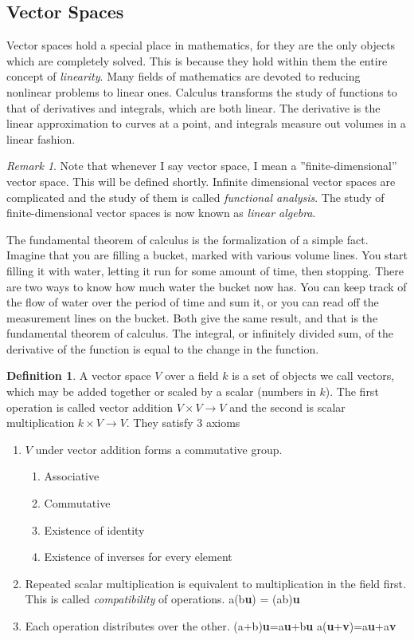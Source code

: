 \documentclass[12pt]{article}
\theoremstyle{definition}
\newtheorem{definition}{Definition}[section]
\theoremstyle{remark}
\newtheorem*{remark}{Remark}
\theoremstyle{example}
\def\b#1{\textbf{#1}}
\begin{document}
\subsection{Vector Spaces}

Vector spaces hold a special place in mathematics, for they are the only objects which are completely solved. This is because they hold within them the entire concept of \textit{linearity}. Many fields of mathematics are devoted to reducing nonlinear problems to linear ones. Calculus transforms the study of functions to that of derivatives and integrals, which are both linear. The derivative is the linear approximation to curves at a point, and integrals measure out volumes in a linear fashion.

\begin{remark}
	Note that whenever I say vector space, I mean a ''finite-dimensional'' vector space. This will be defined shortly. Infinite dimensional vector spaces are complicated and the study of them is called \textit{functional analysis}. The study of finite-dimensional vector spaces is now known as \textit{linear algebra}.
\end{remark}

The fundamental theorem of calculus is the formalization of a simple fact. Imagine that you are filling a bucket, marked with various volume lines. You start filling it with water, letting it run for some amount of time, then stopping. There are two ways to know how much water the bucket now has. You can keep track of the flow of water over the period of time and sum it, or you can read off the measurement lines on the bucket. Both give the same result, and that is the fundamental theorem of calculus. The integral, or infinitely divided sum, of the derivative of the function is equal to the change in the function.


\begin{definition}
	A vector space $V$ over a field $k$ is a set of objects we call vectors, which may be added together or scaled by a scalar (numbers in $k$). The first operation is called vector addition $V\times V\to V$ and the second is scalar multiplication $k\times V\to V$. They satisfy 3 axioms
	
	\begin{enumerate}
		\item $V$ under vector addition forms a commutative group.
		\begin{enumerate}
			\item Associative
			\item Commutative
			\item Existence of identity
			\item Existence of inverses for every element
		\end{enumerate}
		\item Repeated scalar multiplication is equivalent to multiplication in the field first. This is called \textit{compatibility} of operations.
		\subitem a(b\b{u}) = (ab)\b{u}
		\item Each operation distributes over the other.
		\subitem (a+b)\b{u}=a\b{u}+b\b{u}
		\subitem a(\b{u}+\b{v})=a\b{u}+a\b{v}
	\end{enumerate}
\end{definition}
\end{document}
